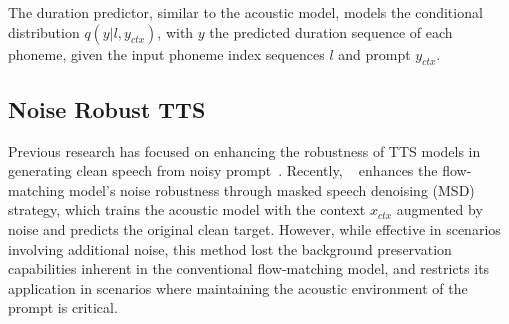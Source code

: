 The duration predictor, similar to the acoustic model, models the conditional distribution $q(y | l, y_{ctx})$, with $y$ the predicted duration sequence of each phoneme, given the input phoneme index sequences $l$ and prompt $y_{ctx}$. 

\subsection{Noise Robust TTS}
Previous research has focused on enhancing the robustness of TTS models in generating clean speech from noisy prompt~\cite{saeki22_interspeech,zhang2021denoispeech,fujita2024noise}. Recently, ~\cite{wang2024investigation} enhances the flow-matching model's noise robustness through masked speech denoising (MSD) strategy, which trains the acoustic model with the context $x_{ctx}$ augmented by noise and predicts the original clean target. However, while effective in scenarios involving additional noise, this method lost the background preservation capabilities inherent in the conventional flow-matching model, and restricts its application in scenarios where maintaining the acoustic environment of the prompt is critical.




